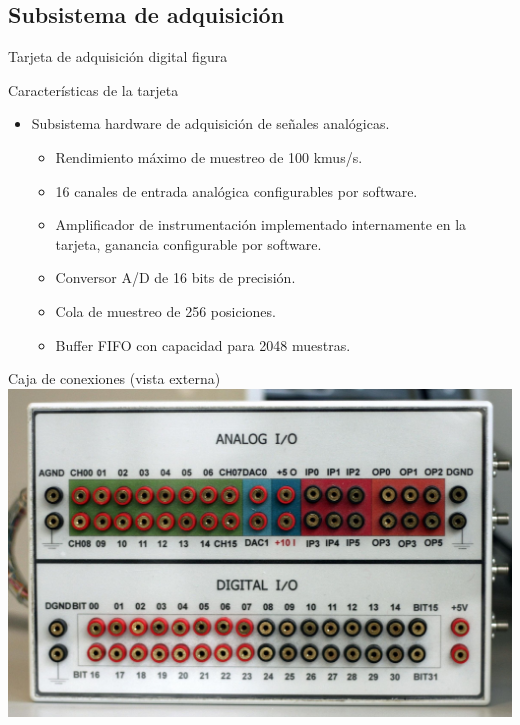 \documentclass[utf8, compress]			{beamer}
\begin{document}
\subsection{Subsistema de adquisición}

\begin{frame}{Tarjeta de adquisición digital}
    \alert{figura}
\end{frame}

\begin{frame}{Características de la tarjeta}
    \begin{itemize}
	\item Subsistema hardware de adquisición de señales analógicas.
	    \begin{itemize}
		\item Rendimiento máximo de muestreo de 100 kmus/s.
		\item 16 canales de entrada analógica configurables por software.
		\item Amplificador de instrumentación implementado internamente en
		    la tarjeta, ganancia configurable por software.
		\item Conversor A/D de 16 bits de precisión.
		\item Cola de muestreo de 256 posiciones.
		\item Buffer FIFO con capacidad para 2048 muestras.
	    \end{itemize}
    \end{itemize}
\end{frame}

\begin{frame}{Caja de conexiones (vista externa)}
    \includegraphics{exterior.jpg}
\end{frame}
\end{document}
